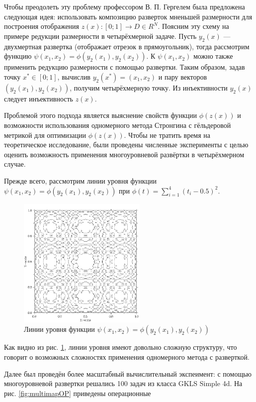 \par
Чтобы преодолеть эту проблему профессором В. П. Гергелем была предложена следующая идея: использовать композицию разверток мненьшей размерности для построения отображения
\(z(x): [0;1] \rightarrow D \in R^N\).
Поясним эту схему на примере редукции размерности в четырёхмерной задаче. Пусть \(y_2(x)\) --- двухмертная развертка (отображает отрезок в прямоугольник), тогда рассмотрим функцию
\(\psi(x_1,x_2)=\phi(y_2(x_1), y_2(x_2))\). К \(\psi(x_1,x_2)\) можно также применить редукцию размерности с помощью развертки. Таким образом, задав точку \(x^*\in [0;1]\),
вычислив \(y_2(x^*)=(x_1,x_2)\) и пару векторов \((y_2(x_1), y_2(x_2))\), получим четырёхмерную точку. Из инъективности \(y_2(x)\) следует инъективность \(z(x)\).
\par
Проблемой этого подхода является выяснение свойств функции \(\phi(z(x))\) и возможности использования одномерного метода Стронгина с гёльдеровой метрикой для оптимизации \(\phi(z(x))\).
Чтобы не тратить время на теоретическое исследование, были проведены численные эксперименты с целью оценить возможность применения многоуровневой развёртки в четырёхмерном случае.
\par
Прежде всего, рассмотрим линии уровня функции \(\psi(x_1,x_2)=\phi(y_2(x_1), y_2(x_2))\) при \(\phi(t)=\sum_{i=1}^{4}(t_i-0.5)^2\).
\begin{figure}[ht]
	\center
  \includegraphics[width=0.55\textwidth]{pictures/multimap_isolines.png}
  \caption{Линии уровня функции \(\psi(x_1,x_2)=\phi(y_2(x_1), y_2(x_2))\)}
  \label{fig:1}
\end{figure}
Как видно из рис. \ref{fig:1}, линии уровня имеют довольно сложную структуру, что говорит о возможных сложностях применения одномерного метода с разверткой.
\par
Далее был проведён более масштабный вычислительный экспеимент: с помощью многоуровневой развертки решались 100 задач из класса GKLS Simple 4d. На рис. \ref{fig:multimapOP} приведены операционные
